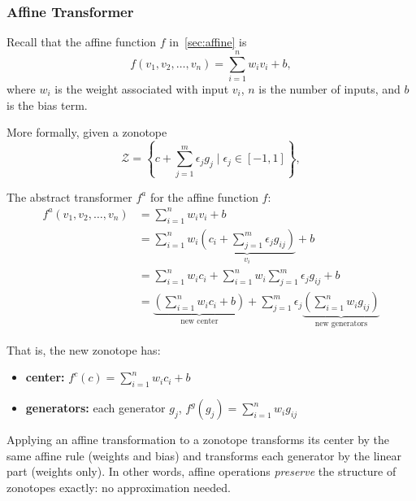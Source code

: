 \documentclass[oneside,11pt,dvipsnames]{book}
\numberwithin{equation}{section}
\theoremstyle{definition}
\theoremstyle{remark}
\begin{document}
\subsubsection{Affine Transformer}

Recall that the affine function \(f\) in~\autoref{sec:affine} is
\[
f(v_1, v_2, \ldots, v_n) = \sum_{i=1}^{n} w_i v_i + b, 
\]
where \(w_i\) is the weight associated with input \(v_i\), \(n\) is the number of inputs, and \(b\) is the bias term.


More formally, given a zonotope
\[
\mathcal{Z} = \left\{ c + \sum_{j=1}^{m} \epsilon_j g_j \mid \epsilon_j \in [-1, 1] \right\},
\]


The abstract transformer \(f^a\) for the affine function \(f\):
\begin{equation}
    \begin{aligned}
    f^a(v_1, v_2, \ldots, v_n) &= \sum_{i=1}^{n} w_i v_i + b \\
    &= \sum_{i=1}^{n} w_i \underbrace{\left(c_i + \sum_{j=1}^{m} \epsilon_{j} g_{ij}\right)}_{v_i} + b \\
    &= \sum_{i=1}^{n} w_i c_i + \sum_{i=1}^{n} w_i \sum_{j=1}^{m} \epsilon_{j} g_{ij}  + b\\
    &= \underbrace{\left(\sum_{i=1}^{n} w_i c_i + b\right)}_{\text{new center}} + \sum_{j=1}^{m} \epsilon_{j} \underbrace{\left(\sum_{i=1}^{n} w_i g_{ij}\right)}_{\text{new generators}}
    \end{aligned}
\end{equation}


That is, the new zonotope has:
\begin{itemize}
  \item \textbf{center:} \(f^c(c) = \sum_{i=1}^{n} w_i c_i + b\)
  \item \textbf{generators:} each generator $g_j$, \(f^g(g_j) = \sum_{i=1}^{n} w_i g_{ij}\)
\end{itemize}


Applying an affine transformation to a zonotope transforms its center by the same affine rule (weights and bias) and transforms each generator by the linear part (weights only).
In other words, affine operations \emph{preserve} the structure of zonotopes exactly: no approximation needed.  %
\end{document}
